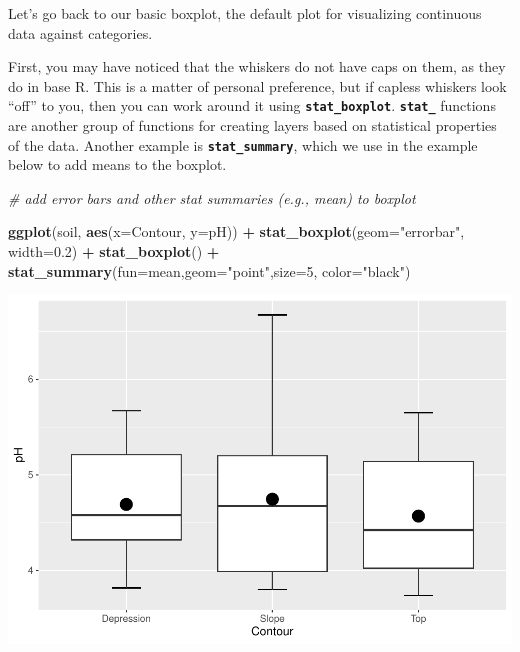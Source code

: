 \documentclass[
]{article}
\newenvironment{Shaded}{\begin{snugshade}}{\end{snugshade}}
\newcommand{\AttributeTok}[1]{\textcolor[rgb]{0.13,0.29,0.53}{#1}}
\newcommand{\CommentTok}[1]{\textcolor[rgb]{0.56,0.35,0.01}{\textit{#1}}}
\newcommand{\DecValTok}[1]{\textcolor[rgb]{0.00,0.00,0.81}{#1}}
\newcommand{\FloatTok}[1]{\textcolor[rgb]{0.00,0.00,0.81}{#1}}
\newcommand{\FunctionTok}[1]{\textcolor[rgb]{0.13,0.29,0.53}{\textbf{#1}}}
\newcommand{\NormalTok}[1]{#1}
\newcommand{\SpecialCharTok}[1]{\textcolor[rgb]{0.81,0.36,0.00}{\textbf{#1}}}
\newcommand{\StringTok}[1]{\textcolor[rgb]{0.31,0.60,0.02}{#1}}
\begin{document}
Let's go back to our basic boxplot, the default plot for visualizing
continuous data against categories.

First, you may have noticed that the whiskers do not have caps on them,
as they do in base R. This is a matter of personal preference, but if
capless whiskers look ``off'' to you, then you can work around it using
\textbf{\texttt{stat\_boxplot}}. \textbf{\texttt{stat\_}} functions are
another group of functions for creating layers based on statistical
properties of the data. Another example is
\textbf{\texttt{stat\_summary}}, which we use in the example below to
add means to the boxplot.

\begin{Shaded}
\begin{Highlighting}[]
\CommentTok{\# add error bars and other stat summaries (e.g., mean) to boxplot}

\FunctionTok{ggplot}\NormalTok{(soil, }\FunctionTok{aes}\NormalTok{(}\AttributeTok{x=}\NormalTok{Contour, }\AttributeTok{y=}\NormalTok{pH)) }\SpecialCharTok{+}
  \FunctionTok{stat\_boxplot}\NormalTok{(}\AttributeTok{geom=}\StringTok{"errorbar"}\NormalTok{, }\AttributeTok{width=}\FloatTok{0.2}\NormalTok{) }\SpecialCharTok{+}  
  \FunctionTok{stat\_boxplot}\NormalTok{() }\SpecialCharTok{+}
  \FunctionTok{stat\_summary}\NormalTok{(}\AttributeTok{fun=}\NormalTok{mean,}\AttributeTok{geom=}\StringTok{"point"}\NormalTok{,}\AttributeTok{size=}\DecValTok{5}\NormalTok{, }\AttributeTok{color=}\StringTok{"black"}\NormalTok{)}
\end{Highlighting}
\end{Shaded}

\includegraphics{module1_3_files/figure-latex/unnamed-chunk-40-1.pdf}
\end{document}
